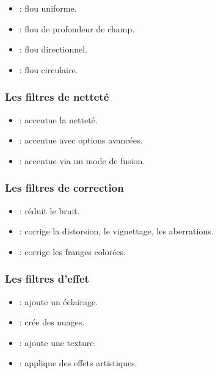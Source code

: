 \begin{itemize}
    \item {} : flou uniforme.
    \item {} : flou de profondeur de champ.
    \item {} : flou directionnel.
    \item {} : flou circulaire.
\end{itemize}

\subsubsection{Les filtres de netteté}

\begin{itemize}
    \item {} : accentue la netteté.
    \item {} : accentue avec options avancées.
    \item {} : accentue via un mode de fusion.
\end{itemize}

\subsubsection{Les filtres de correction}

\begin{itemize}
    \item {} : réduit le bruit.
    \item {} : corrige la distorsion, le vignettage, les aberrations.
    \item {} : corrige les franges colorées.
\end{itemize}

\subsubsection{Les filtres d'effet}

\begin{itemize}
    \item {} : ajoute un éclairage.
    \item {} : crée des nuages.
    \item {} : ajoute une texture.
    \item {} : applique des effets artistiques.
\end{itemize}


